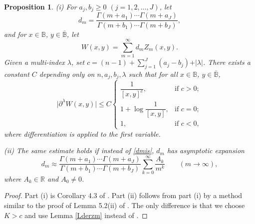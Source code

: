 \documentclass{amsart}
\newtheorem{proposition}[theorem]{Proposition}
\theoremstyle{definition}
\theoremstyle{remark}
\begin{document}
\begin{proposition}\label{PEstW}
(i) For $a_j,b_j\ge 0$ $(j=1,2,\dots,J)$, let
\begin{equation}\label{dmis}
d_m=\frac{\Gamma(m+a_1)\cdots\Gamma(m+a_J)}{\Gamma(m+b_1)\cdots\Gamma(m+b_J)},
\end{equation}
and for $x\in\mathbb B$, $y\in\overline{\mathbb B}$, let
\begin{equation*}
W(x,y)=\sum_{m=1}^\infty d_m Z_m(x,y).
\end{equation*}
Given a multi-index $\lambda$, set
$c=(n-1)+\sum_{j=1}^J(a_j-b_j)+\vert\lambda\vert$.
There exists a constant $C$ depending only on $n,a_j,b_j,\lambda$ such that
for all $x\in\mathbb B$, $y\in\overline{\mathbb B}$,
\begin{equation*}
\bigl\vert\partial^\lambda W(x,y)\bigr\vert
\leq C\begin{cases}
\dfrac{1}{[x,y]^{c}},&\text{if $c>0$};\\
1+\log\dfrac{1}{[x,y]},&\text{if $c=0$};\\
1,&\text{if $c<0$},
\end{cases}
\end{equation*}
where differentiation is applied to the first variable.

(ii) The same estimate holds if instead of \eqref{dmis}, $d_m$ has asymptotic
expansion
\begin{equation*}
d_m\approx\frac{\Gamma(m+a_1)\cdots\Gamma(m+a_J)}{\Gamma(m+b_1)\cdots\Gamma(m+b_J)}
\sum_{k=0}^\infty\frac{A_k}{m^k}
\qquad (m\to\infty),
\end{equation*}
where $A_k\in\mathbb R$ and $A_0\neq 0$.
\end{proposition}

\begin{proof}
Part (i) is Corollary 4.3 of \cite{U}.
Part (ii) follows from part (i) by a method similar to the proof of
Lemma 5.2(ii) of \cite{U}.
The only difference is that we choose $K>c$ and use Lemma \ref{Lderzm}
instead of \cite[Lemma 5.1]{U}.
\end{proof}
\end{document}
